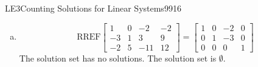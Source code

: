 \begin{exercise}{LE3}{Counting Solutions for Linear Systems}{9916}
\begin{exerciseAnswer}
\begin{enumerate}[(a)]
 
\item  

 \[\mathrm{RREF}\left[\begin{array}{ccc|c}
1 & 0 & -2 & -2 \\
-3 & 1 & 3 & 9 \\
-2 & 5 & -11 & 12
\end{array}\right]=\left[\begin{array}{ccc|c}
1 & 0 & -2 & 0 \\
0 & 1 & -3 & 0 \\
0 & 0 & 0 & 1
\end{array}\right]\] The solution set has no solutions. The solution set is \(\emptyset\). 

 
\end{enumerate}

     \end{exerciseAnswer}
 \end{exercise}


